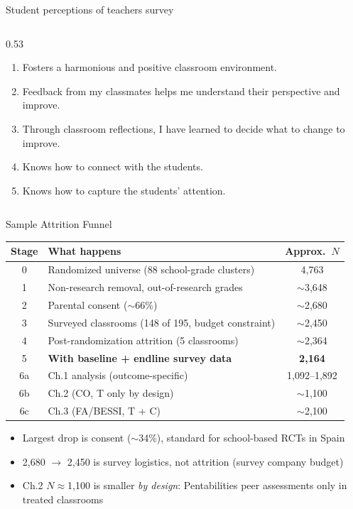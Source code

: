\documentclass[xcolor=usenames,dvipsnames]{beamer}
\begin{document}
\begin{frame}{Student perceptions of teachers survey}
\begin{columns}[T,onlytextwidth]
\begin{column}{0.53\textwidth}
\begin{enumerate}
      \item Fosters a harmonious and positive classroom environment.
      \item Feedback from my classmates helps me understand their perspective and improve.
      \item Through classroom reflections, I have learned to decide what to change to improve.
      \item Knows how to connect with the students.
      \item Knows how to capture the students' attention.
    \end{enumerate}
  \end{column}
\end{columns}
\vfill
\hyperlink{slide:perception}{}
\end{frame}

\begin{frame}{Sample Attrition Funnel}
\label{slide:attrition}
\scriptsize
\begin{center}
\begin{tabular}{clc}
\toprule
Stage & What happens & Approx.\ $N$ \\
\midrule
0 & Randomized universe (88 school-grade clusters) & 4,763 \\
1 & Non-research removal, out-of-research grades & $\sim$3,648 \\
2 & Parental consent ($\sim$66\%) & $\sim$2,680 \\
3 & Surveyed classrooms (148 of 195, budget constraint) & $\sim$2,450 \\
4 & Post-randomization attrition (5 classrooms) & $\sim$2,364 \\
5 & \textbf{With baseline + endline survey data} & \textbf{2,164} \\
\midrule
6a & Ch.1 analysis (outcome-specific) & 1,092--1,892 \\
6b & Ch.2 (CO, T only by design) & $\sim$1,100 \\
6c & Ch.3 (FA/BESSI, T + C) & $\sim$2,100 \\
\bottomrule
\end{tabular}
\end{center}
\vspace{0.2cm}
\footnotesize
\begin{itemize}
\item Largest drop is consent ($\sim$34\%), standard for school-based RCTs in Spain
\item 2,680 $\rightarrow$ 2,450 is survey logistics, not attrition (survey company budget)
\item Ch.2 $N \approx$1,100 is smaller \emph{by design}: Pentabilities peer assessments only in treated classrooms
\end{itemize}
\vspace{0.2cm}
\hyperlink{slide:sample}{}
\end{frame}
\end{document}
